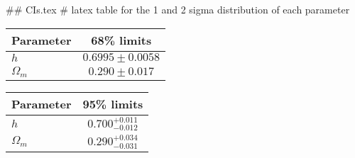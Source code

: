 ## CIs.tex
# latex table for the 1 and 2 sigma distribution of each parameter

\begin{tabular} { l  c}
 Parameter &  68\% limits\\
\hline
{\boldmath$h              $} & $0.6995\pm 0.0058          $\\
{\boldmath$\Omega_m       $} & $0.290\pm 0.017            $\\
\hline
\end{tabular}

\begin{tabular} { l  c}
 Parameter &  95\% limits\\
\hline
{\boldmath$h              $} & $0.700^{+0.011}_{-0.012}   $\\
{\boldmath$\Omega_m       $} & $0.290^{+0.034}_{-0.031}   $\\
\hline
\end{tabular}
